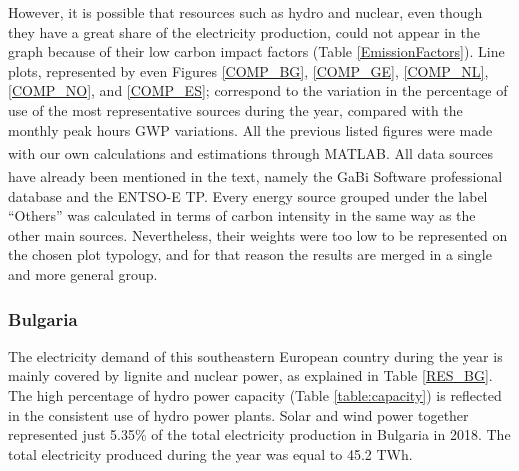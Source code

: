 However, it is possible that resources such as hydro and nuclear, even though they have a great share of the electricity production,  could not appear in the graph because of their low carbon impact factors (Table \ref{EmissionFactors}). Line plots, represented by even Figures \ref{COMP_BG}, \ref{COMP_GE}, \ref{COMP_NL}, \ref{COMP_NO}, and \ref{COMP_ES}; correspond to the variation in the percentage of use of the most representative sources during the year, compared with the monthly peak hours GWP variations. {All the previous listed figures were made with our own calculations and estimations through MATLAB\textsuperscript{\textregistered}. All data sources have already been mentioned in the text, namely the  GaBi\textsuperscript{\textregistered} Software professional database and the ENTSO-E TP.} {Every energy source grouped under the label ``Others'' was calculated in terms of carbon intensity in the same way as the other main sources. Nevertheless, their weights were too low to be represented on the chosen plot typology, and for that reason the results are merged in a single and more general group}.\\





\subsubsection{Bulgaria}
The electricity demand of this southeastern European country  during the year is mainly covered by lignite and nuclear power, as explained in Table \ref{RES_BG}. The high percentage of hydro power capacity (Table \ref{table:capacity}) is reflected in the  consistent use of hydro power plants. Solar and wind power together represented  just 5.35\% of the total electricity production in Bulgaria in 2018. The total electricity produced during the year was equal to 45.2 TWh. 
 
 
 \begin{table}[]
\centering
\caption{Percentage of resources used during peak and off-peak hours in Bulgaria  \cite{Entso-eProduction}.}
\label{RES_BG}
\end{table}
 
